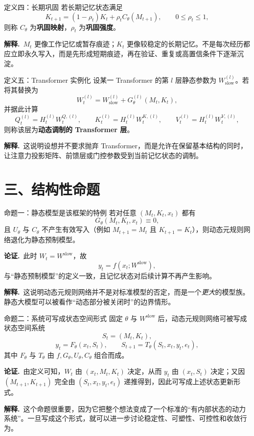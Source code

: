 \documentclass[11pt]{article}
\newcommand{\Explain}{\par\smallskip\noindent\textbf{解释.}\ }
\newcommand{\Proof}{\par\smallskip\noindent\textbf{论证.}\ }
\begin{document}
\begin{defbox}{定义四：长期巩固}
若长期记忆状态满足
\[
 K_{t+1}=(1-\rho_t)K_t + \rho_t C_\theta(M_{t+1}),
\qquad 0\le \rho_t \le 1,
\]
则称 $C_\theta$ 为\textbf{巩固映射}，$\rho_t$ 为\textbf{巩固强度}。
\end{defbox}
\Explain $M_t$ 更像工作记忆或暂存痕迹；$K_t$ 更像较稳定的长期记忆。不是每次经历都应立即永久写入，而是先形成短期痕迹，再在验证、重复或高置信条件下逐渐沉淀。

\begin{defbox}{定义五：Transformer 实例化}
设某一 Transformer 的第 $l$ 层静态参数为 $W^{(l)}_{\mathrm{slow}}$。若将其替换为
\[
 W_t^{(l)} = W^{(l)}_{\mathrm{slow}} + G^{(l)}_\theta(M_t,K_t),
\]
并据此计算
\[
 Q_t^{(l)} = H_t^{(l)}W_{t}^{Q,(l)},\qquad
 K_t^{(l)} = H_t^{(l)}W_{t}^{K,(l)},\qquad
 V_t^{(l)} = H_t^{(l)}W_{t}^{V,(l)},
\]
则称该层为\textbf{动态调制的 Transformer 层}。
\end{defbox}
\Explain 这说明设想并不要求抛弃 Transformer，而是允许在保留基本结构的同时，让注意力投影矩阵、前馈层或门控参数受到当前记忆状态的调制。

\section*{三、结构性命题}

\begin{propbox}{命题一：静态模型是该框架的特例}
若对任意 $(M_t,K_t,x_t)$ 都有
\[
 G_\theta(M_t,K_t,x_t) \equiv 0,
\]
且 $U_\theta$ 与 $C_\theta$ 不产生有效写入（例如 $M_{t+1}=M_t$ 且 $K_{t+1}=K_t$），则动态元规则网络退化为静态预制模型。
\end{propbox}
\Proof 此时 $W_t = W^{\mathrm{slow}}$，故
\[
 y_t = f(x_t;W^{\mathrm{slow}}),
\]
与“静态预制模型”的定义一致，且记忆状态对后续计算不再产生影响。
\Explain 这说明动态元规则网络并不是对标准模型的否定，而是一个\emph{更大}的模型族。静态大模型可以被看作“动态部分被关闭时”的边界情形。

\begin{propbox}{命题二：系统可写成状态空间形式}
固定 $\theta$ 与 $W^{\mathrm{slow}}$ 后，动态元规则网络可被写成状态空间系统
\[
 S_t=(M_t,K_t),
\]
\[
 y_t = F_\theta(x_t,S_t),
\qquad
 S_{t+1}=T_\theta(S_t,x_t,y_t,e_t),
\]
其中 $F_\theta$ 与 $T_\theta$ 由 $f,G_\theta,U_\theta,C_\theta$ 组合而成。
\end{propbox}
\Proof 由定义可知，$W_t$ 由 $(x_t,M_t,K_t)$ 决定，从而 $y_t$ 由 $(x_t,S_t)$ 决定；又因 $(M_{t+1},K_{t+1})$ 完全由 $(S_t,x_t,y_t,e_t)$ 递推得到，因此可写成上述状态更新形式。
\Explain 这个命题很重要，因为它把整个想法变成了一个标准的“有内部状态的动力系统”。一旦写成这个形式，就可以进一步讨论稳定性、可塑性、可控性和收敛行为。
\end{document}
